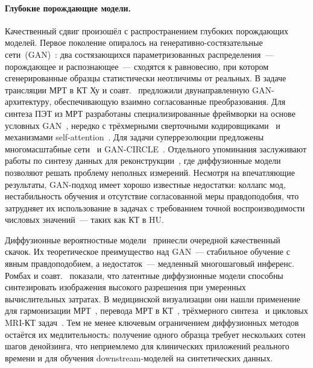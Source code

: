 \paragraph{Глубокие порождающие модели.}
Качественный сдвиг произошёл с распространением глубоких порождающих моделей. Первое поколение опиралось на генеративно-состязательные сети~(GAN)~\cite{goodfellow2014generative}: два состязающихся параметризованных распределения~--- порождающее и распознающее~--- сходятся к равновесию, при котором сгенерированные образцы статистически неотличимы от реальных. В задаче трансляции МРТ в КТ Ху и соавт.~\cite{hu2021bidirectional} предложили двунаправленную GAN-архитектуру, обеспечивающую взаимно согласованные преобразования. Для синтеза ПЭТ из МРТ разработаны специализированные фреймворки на основе условных GAN~\cite{WEI2019101546, ZHANG2022106676, WANG2024102983}, нередко с трёхмерными сверточными кодировщиками~\cite{WANG2024102983} и механизмами self-attention~\cite{https://doi.org/10.1002/mrm.28819}. Для задачи суперрезолюции предложены многомасштабные сети~\cite{pham2019multiscale} и GAN-CIRCLE~\cite{you2019ct}. Отдельного упоминания заслуживают работы по синтезу данных для реконструкции~\cite{peng2022towards, xie2022measurement}, где диффузионные модели позволяют решать проблему неполных измерений. Несмотря на впечатляющие результаты, GAN-подход имеет хорошо известные недостатки: коллапс мод, нестабильность обучения и отсутствие согласованной меры правдоподобия, что затрудняет их использование в задачах с требованием точной воспроизводимости числовых значений~--- таких как КТ в HU.

Диффузионные вероятностные модели~\cite{ho2020denoising, sohl2015deep} принесли очередной качественный скачок. Их теоретическое преимущество над GAN~--- стабильное обучение с явным правдоподобием, а недостаток~--- медленный многошаговый инференс. Ромбах и соавт.~\cite{rombach2022high} показали, что латентные диффузионные модели способны синтезировать изображения высокого разрешения при умеренных вычислительных затратах. В медицинской визуализации они нашли применение для гармонизации МРТ~\cite{durrer2023diffusion}, перевода МРТ в КТ~\cite{graf2023denoising}, трёхмерного синтеза~\cite{guo2025maisi, zhu2023make} и цикловых MRI-КТ задач~\cite{pan2025cycle}. Тем не менее ключевым ограничением диффузионных методов остаётся их медлительность: получение одного образца требует нескольких сотен шагов денойзинга, что неприемлемо для клинических приложений реального времени и для обучения downstream-моделей на синтетических данных.

